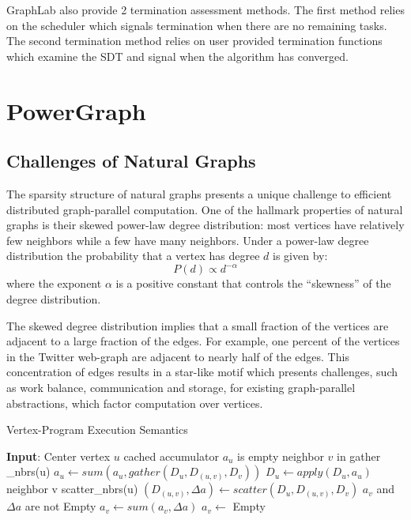 \documentclass {article}
\begin{document}
GraphLab also provide 2 termination assessment methods. The first method relies on
the scheduler which signals termination when there are no
remaining tasks. The second termination
method relies on user provided termination functions which
examine the SDT and signal when the algorithm has converged.


\section{PowerGraph}
\subsection{Challenges of Natural Graphs}
The sparsity structure of natural graphs presents a unique
challenge to efficient distributed graph-parallel computation. 
One of the hallmark properties of natural graphs is their skewed 
power-law degree distribution: most vertices have relatively few 
neighbors while a few have many neighbors. Under a power-law degree 
distribution the probability that a vertex has degree $d$ is given 
by:
\begin{equation}\label{prob_degree}
  P(d) \propto d^{-\alpha}
\end{equation}
where the exponent $\alpha$ is a positive constant that controls
the ``skewness'' of the degree distribution.


The skewed degree distribution implies that a small
fraction of the vertices are adjacent to a large fraction
of the edges. For example, one percent of the vertices
in the Twitter web-graph are adjacent to nearly half of
the edges. This concentration of edges results in a star-like motif 
which presents challenges, such as work balance, communication and 
storage, for existing graph-parallel abstractions, which factor 
computation over vertices.


\begin{algorithm}
\caption{Vertex-Program Execution Semantics}
\label{vertex_algo}
\begin{algorithmic}[1]
\State \textbf{Input}: Center vertex $u$
\If cached accumulator $a_u$ is empty
    \For neighbor $v$ in gather \_nbrs(u)
    \State $a_u \leftarrow sum(a_u, gather(D_u, D_{(u, v)}, D_v))$
    \EndFor
\EndIf
\State $D_u \leftarrow apply(D_u, a_u)$
\For neighbor v scatter\_nbrs(u)
    \State $(D_{(u, v)}, \Delta a) \leftarrow scatter(D_u, D_{(u,v)}, D_v)$
    \If $a_v$ and $\Delta a$ are not Empty
        \State $a_v \leftarrow sum(a_v, \Delta a)$
    \Else
        \State $a_v \leftarrow$ Empty
    \EndIf
\EndFor
\end{algorithmic}
\end{algorithm}
\end{document}
